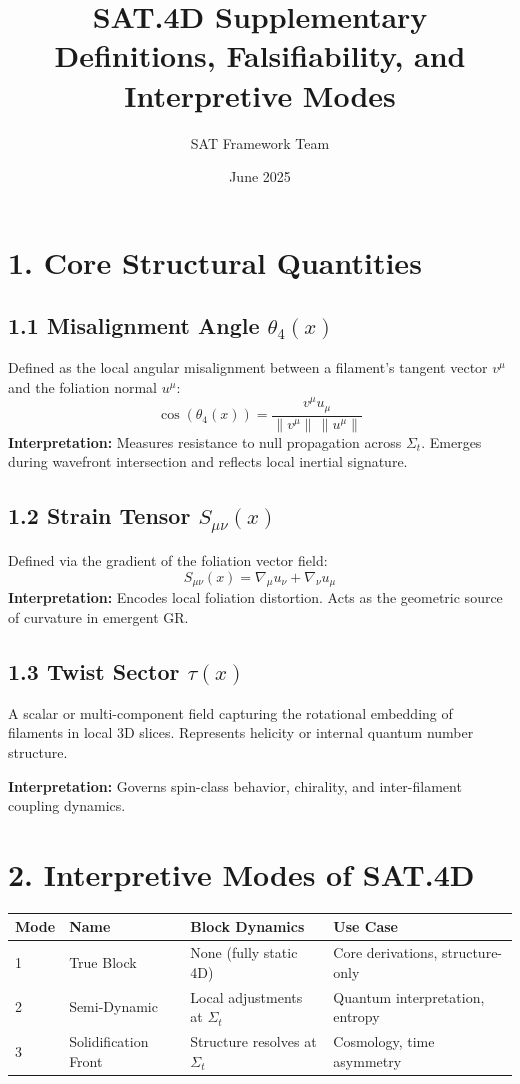 \documentclass[12pt]{article}
\title{\textbf{SAT.4D Supplementary Definitions, Falsifiability, and Interpretive Modes}}
\author{SAT Framework Team}
\date{June 2025}
\begin{document}
\maketitle

\section*{1. Core Structural Quantities}

\subsection*{1.1 Misalignment Angle $\theta_4(x)$}
Defined as the local angular misalignment between a filament’s tangent vector $v^\mu$ and the foliation normal $u^\mu$:
\[
\cos(\theta_4(x)) = \frac{v^\mu u_\mu}{\|v^\mu\| \, \|u^\mu\|}
\]
\textbf{Interpretation:} Measures resistance to null propagation across $\Sigma_t$. Emerges during wavefront intersection and reflects local inertial signature.

\subsection*{1.2 Strain Tensor $S_{\mu\nu}(x)$}
Defined via the gradient of the foliation vector field:
\[
S_{\mu\nu}(x) = \nabla_\mu u_\nu + \nabla_\nu u_\mu
\]
\textbf{Interpretation:} Encodes local foliation distortion. Acts as the geometric source of curvature in emergent GR.

\subsection*{1.3 Twist Sector $\tau(x)$}
A scalar or multi-component field capturing the rotational embedding of filaments in local 3D slices. Represents helicity or internal quantum number structure.

\textbf{Interpretation:} Governs spin-class behavior, chirality, and inter-filament coupling dynamics.

\section*{2. Interpretive Modes of SAT.4D}

\begin{center}
\begin{tabular}{@{}llll@{}}
\toprule
\textbf{Mode} & \textbf{Name} & \textbf{Block Dynamics} & \textbf{Use Case} \\
\midrule
1 & True Block & None (fully static 4D) & Core derivations, structure-only \\
2 & Semi-Dynamic & Local adjustments at $\Sigma_t$ & Quantum interpretation, entropy \\
3 & Solidification Front & Structure resolves at $\Sigma_t$ & Cosmology, time asymmetry \\
\bottomrule
\end{tabular}
\end{center}
\end{document}
